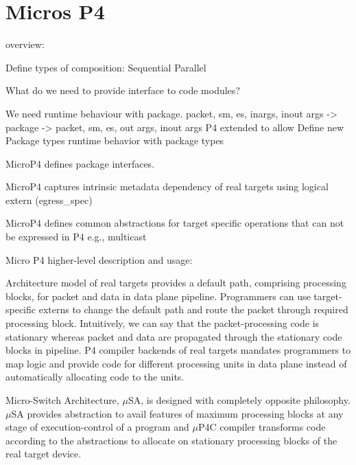 \documentclass{hotnets19}
\begin{document}
\section{Micros P4}

overview:


Define types of composition: 
Sequential
Parallel


What do we need to provide interface to code modules?

We need runtime behaviour with package. 
packet, sm, es, inargs, inout args -> package -> packet, sm, es, out args, inout args
P4 extended to 
allow Define new Package types
runtime behavior with package types

MicroP4 defines package interfaces.


MicroP4 captures intrinsic metadata dependency of real targets using logical extern (egress\_spec)

MicroP4 defines common abstractions for target specific operations that can not be expressed in P4
e.g., multicast



Micro P4 higher-level description and usage:


Architecture model of real targets provides a default path, comprising  processing blocks, for packet and data in data plane pipeline.
Programmers can use target-specific externs to change the default path and route the packet through required processing block.
Intuitively, we can say that the packet-processing code is stationary whereas packet and data are propagated through the stationary code blocks in pipeline.
P4 compiler backends of real targets mandates programmers to map logic and provide code for different processing units in data plane instead of automatically allocating code to the units. 

Micro-Switch Architecture, $\mu$SA, is designed with completely opposite philosophy.
$\mu$SA provides abstraction to avail features of maximum processing blocks at any stage of execution-control of a program and $\mu$P4C compiler transforms code according to the abstractions to allocate on stationary processing blocks of the real target device.
\end{document}
